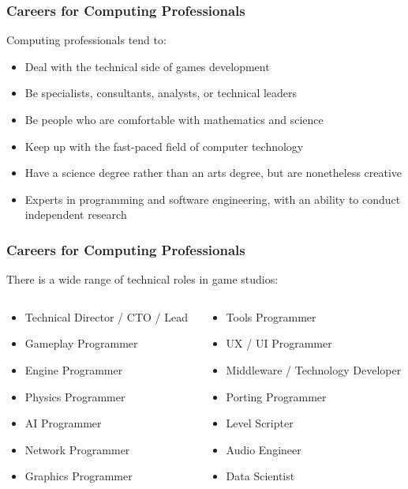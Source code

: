\begin{frame}
	\frametitle{Careers for Computing Professionals}
	
	Computing professionals tend to:
	
	\begin{itemize}
		\item Deal with the technical side of games development \pause
		\item Be specialists, consultants, analysts, or technical leaders \pause
		\item Be people who are comfortable with mathematics and science \pause
		\item Keep up with the fast-paced field of computer technology \pause
		\item Have a science degree rather than an arts degree, but are nonetheless creative \pause
		\item Experts in programming and software engineering, with an ability to conduct independent research
	\end{itemize}
\end{frame}

\begin{frame}
	\frametitle{Careers for Computing Professionals}
	
	There is a wide range of technical roles in game studios:
	
	\begin{columns}
		\begin{column}{0.5\textwidth}
			\begin{itemize}
				\item Technical Director / CTO / Lead
				\item Gameplay Programmer
				\item Engine Programmer
				\item Physics Programmer
				\item AI Programmer
				\item Network Programmer
				\item Graphics Programmer
			\end{itemize}
		\end{column}
		\begin{column}{0.5\textwidth}
			\begin{itemize}
				\item Tools Programmer
				\item UX / UI Programmer
				\item Middleware / Technology Developer
				\item Porting Programmer
				\item Level Scripter
				\item Audio Engineer
				\item Data Scientist
			\end{itemize}
		\end{column}
	\end{columns}
\end{frame}

